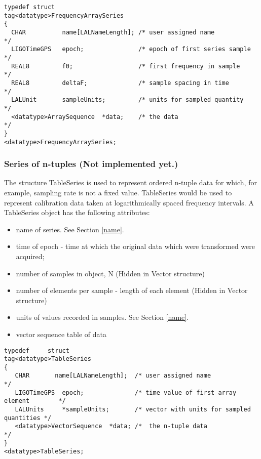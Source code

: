 \documentclass[]{ligodcc}
\begin{document}
{\footnotesize
\begin{verbatim}
typedef struct
tag<datatype>FrequencyArraySeries
{
  CHAR          name[LALNameLength]; /* user assigned name           */
  LIGOTimeGPS   epoch;               /* epoch of first series sample */
  REAL8         f0;                  /* first frequency in sample    */
  REAL8         deltaF;              /* sample spacing in time       */
  LALUnit       sampleUnits;         /* units for sampled quantity   */
  <datatype>ArraySequence  *data;    /* the data                     */
}
<datatype>FrequencyArraySeries;
\end{verbatim}}


\subsubsection{Series of n-tuples  {\bf (Not implemented yet.)} }

The structure TableSeries is used to represent ordered n-tuple data
for which, for example, sampling rate is not a fixed value.
TableSeries would be used to represent calibration data taken at
logarithmically spaced frequency intervals. A TableSeries object has
the following attributes:

\begin{itemize}
\vspace{-0.1in}
\item
name of series. See Section \ref{name}.
\vspace{-0.1in}
\item
time of epoch - time at which the original data which were transformed were acquired;
\vspace{-0.1in}
\item
number of samples in object, N (Hidden in Vector structure)
\vspace{-0.1in}
\item
number of elements per sample - length of each element  (Hidden in Vector structure)
\vspace{-0.1in}
\item
units of values recorded in samples. See Section \ref{name}.
\vspace{-0.1in}
\item
vector sequence table of data 
\end{itemize}

{\footnotesize
\begin{verbatim}
typedef		struct 			
tag<datatype>TableSeries
{
   CHAR       name[LALNameLength];  /* user assigned name                       */
   LIGOTimeGPS  epoch;              /* time value of first array element        */
   LALUnits     *sampleUnits;       /* vector with units for sampled quantities */
   <datatype>VectorSequence  *data; /*  the n-tuple data                        */
}
<datatype>TableSeries;
\end{verbatim}}
\end{document}

